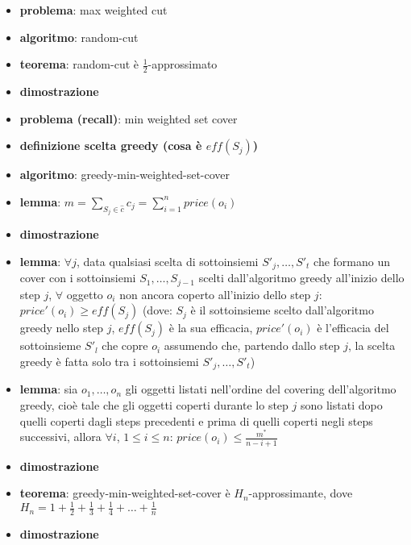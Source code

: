     \begin{itemize}

\item
  \textbf{problema}: max weighted cut
\item
  \textbf{algoritmo}: random-cut
\item
  \textbf{teorema}: random-cut è \({\frac{1}{2}}\)-approssimato
\item
  \textbf{dimostrazione}
\item
  \textbf{problema (recall)}: min weighted set cover
\item
  \textbf{definizione scelta greedy (cosa è \(eff(S_j)\))}
\item
  \textbf{algoritmo}: greedy-min-weighted-set-cover
\item
  \textbf{lemma}:
  \(m = \sum_{S_j \in \hat{c}} c_j = \sum_{i=1}^{n} price(o_i)\)
\item
  \textbf{dimostrazione}
\item
  \textbf{lemma}: \(\forall j\), data qualsiasi scelta di sottoinsiemi
  \(S'_j,\dots,S'_t\) che formano un cover con i sottoinsiemi
  \(S_1,\dots,S_{j-1}\) scelti dall'algoritmo greedy all'inizio dello
  step \(j\), \(\forall\) oggetto \(o_i\) non ancora coperto all'inizio
  dello step \(j\): \(price'(o_i) \geq eff(S_j)\) (dove: \(S_j\) è il
  sottoinsieme scelto dall'algoritmo greedy nello step \(j\),
  \(eff(S_j)\) è la sua efficacia, \(price'(o_i)\) è l'efficacia del
  sottoinsieme \(S'_l\) che copre \(o_i\) assumendo che, partendo dallo
  step \(j\), la scelta greedy è fatta solo tra i sottoinsiemi
  \(S'_j,\dots,S'_t\))
\item
  \textbf{lemma}: sia \(o_1,\dots,o_n\) gli oggetti listati nell'ordine
  del covering dell'algoritmo greedy, cioè tale che gli oggetti coperti
  durante lo step \(j\) sono listati dopo quelli coperti dagli steps
  precedenti e prima di quelli coperti negli steps successivi, allora
  \(\forall i\), \(1 \leq i \leq n\):
  \(price(o_i) \leq {\frac{m^*}{n - i + 1}}\)
\item
  \textbf{dimostrazione}
\item
  \textbf{teorema}: greedy-min-weighted-set-cover è
  \(H_n\)-approssimante, dove
  \(H_n = 1 + {\frac{1}{2}} + {\frac{1}{3}} + {\frac{1}{4}} + \dots + {\frac{1}{n}}\)
\item
  \textbf{dimostrazione}
\end{itemize}

